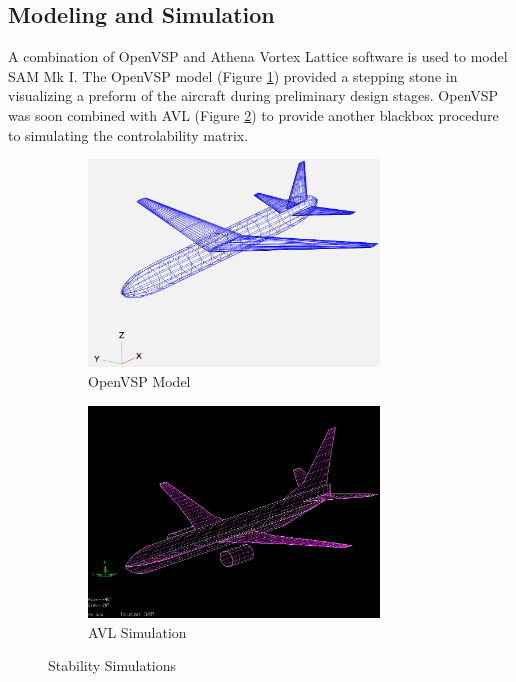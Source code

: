 \subsection{Modeling and Simulation}
A combination of OpenVSP and Athena Vortex Lattice software is used to model SAM Mk I.  The OpenVSP model (Figure \ref{fig:simA}) provided a stepping stone in visualizing a preform of the aircraft during preliminary design stages.  OpenVSP was soon combined with AVL (Figure \ref{fig:simB}) to provide another blackbox procedure to simulating the controlability matrix. 

\begin{figure}[!h]
    \centering
    \begin{subfigure}{0.85\textwidth}
        \centering
        \includegraphics[width=0.85\textwidth]{Photos/stab/openvsp.png}
        \caption{OpenVSP Model}
        \label{fig:simA}
    \end{subfigure}
    \begin{subfigure}{0.85\textwidth}
        \centering
        \includegraphics[width=0.85\textwidth]{Photos/stab/avl.png}
        \caption{AVL Simulation}
        \label{fig:simB}
    \end{subfigure}
    \caption{Stability Simulations}
    \label{fig:sim}
\end{figure}
\clearpage

